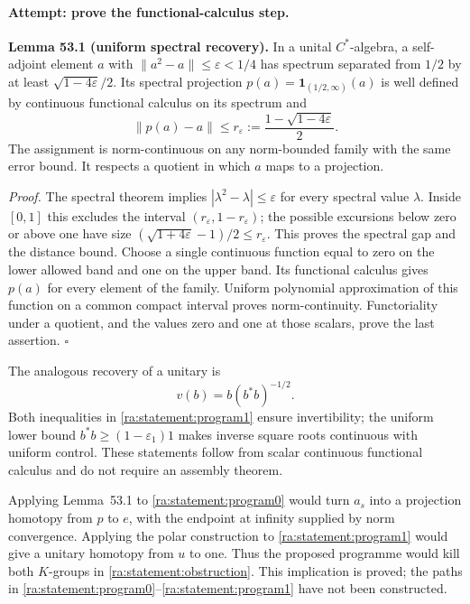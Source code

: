 \documentclass[11pt]{article}
\begin{document}
\paragraph{Attempt: prove the functional-calculus step.}
\textbf{Lemma 53.1 (uniform spectral recovery).} In a unital
$C^*$-algebra, a self-adjoint element $a$ with
$\|a^2-a\|\le\varepsilon<1/4$ has spectrum separated from $1/2$ by at
least $\sqrt{1-4\varepsilon}/2$. Its spectral projection
$p(a)=\mathbf1_{(1/2,\infty)}(a)$ is well defined by continuous
functional calculus on its spectrum and
\begin{equation}\label{ra:statement:recovery}
 \|p(a)-a\|\le
 r_\varepsilon:=\frac{1-\sqrt{1-4\varepsilon}}2.
\end{equation}
The assignment is norm-continuous on any norm-bounded family with the
same error bound. It respects a quotient in which $a$ maps to a projection.

\textit{Proof.} The spectral theorem implies
$|\lambda^2-\lambda|\le\varepsilon$ for every spectral value $\lambda$.
Inside $[0,1]$ this excludes the interval
$(r_\varepsilon,1-r_\varepsilon)$; the possible excursions below zero
or above one have size
$(\sqrt{1+4\varepsilon}-1)/2\le r_\varepsilon$.
This proves the spectral gap and the distance bound. Choose a single
continuous function equal to zero on the lower allowed band and one on
the upper band. Its functional calculus gives $p(a)$ for every element
of the family. Uniform polynomial approximation of this function on a
common compact interval proves norm-continuity. Functoriality under a
quotient, and the values zero and one at those scalars, prove the last
assertion. \hfill$\square$

The analogous recovery of a unitary is
\[
 v(b)=b(b^*b)^{-1/2}.
\]
Both inequalities in \eqref{ra:statement:program1} ensure invertibility; the
uniform lower bound $b^*b\ge(1-\varepsilon_1)1$ makes inverse square roots
continuous with uniform control. These statements follow from scalar
continuous functional calculus and do not require an assembly theorem.

Applying Lemma~53.1 to \eqref{ra:statement:program0} would turn $a_s$ into a
projection homotopy from $p$ to $e$, with the endpoint at infinity supplied
by norm convergence. Applying the polar construction to
\eqref{ra:statement:program1} would give a unitary homotopy from $u$ to one.
Thus the proposed programme would kill both $K$-groups in
\eqref{ra:statement:obstruction}. This implication is proved; the paths in
\eqref{ra:statement:program0}--\eqref{ra:statement:program1} have not been constructed.
\end{document}
